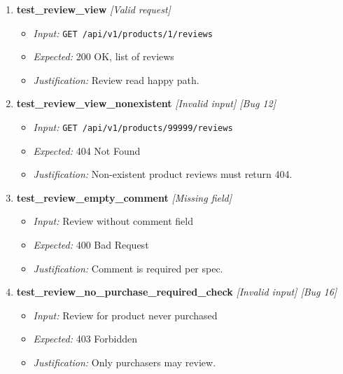 \documentclass{article}
\begin{document}
\begin{enumerate}[resume, label=\textbf{TC\arabic*.}]
\item \textbf{test\_review\_view} \textit{[Valid request]}
\begin{itemize}[noitemsep]
  \item \textit{Input:} \texttt{GET /api/v1/products/1/reviews}
  \item \textit{Expected:} 200 OK, list of reviews
  \item \textit{Justification:} Review read happy path.
\end{itemize}

\item \textbf{test\_review\_view\_nonexistent} \textit{[Invalid input] \textit{[Bug 12]}}
\begin{itemize}[noitemsep]
  \item \textit{Input:} \texttt{GET /api/v1/products/99999/reviews}
  \item \textit{Expected:} 404 Not Found
  \item \textit{Justification:} Non-existent product reviews must return 404.
\end{itemize}

\item \textbf{test\_review\_empty\_comment} \textit{[Missing field]}
\begin{itemize}[noitemsep]
  \item \textit{Input:} Review without comment field
  \item \textit{Expected:} 400 Bad Request
  \item \textit{Justification:} Comment is required per spec.
\end{itemize}

\item \textbf{test\_review\_no\_purchase\_required\_check} \textit{[Invalid input] \textit{[Bug 16]}}
\begin{itemize}[noitemsep]
  \item \textit{Input:} Review for product never purchased
  \item \textit{Expected:} 403 Forbidden
  \item \textit{Justification:} Only purchasers may review.
\end{itemize}
\end{enumerate}
\end{document}
